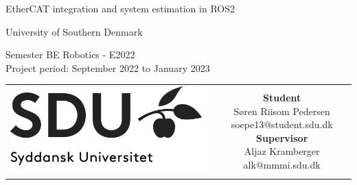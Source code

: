 \begin{titlepage}
	\begin{center}
		
		\null\vspace{2cm}
		
		{\huge
			EtherCAT integration and system estimation in ROS2
		}
	
		\vspace{1cm}
		
		{\Large
			University of Southern Denmark
		}
		
		\vspace{1cm}
		
		{\small
			 Semester BE Robotics - E2022\\
			Project period: September  2022 to January  2023
		}
	
		\vfill
		
		\begin{tabular}{cc}
			\parbox{0.25\textwidth}{
				\includegraphics[width=0.25 \textwidth]{../resources/sdu-logo.png}
			}
			&
			\parbox{0.55\textwidth}{
				{\small
					\textbf{Student} \\
					Søren Riisom Pedersen \hfill soepe13@student.sdu.dk \\
					\textbf{Supervisor} \\
					Aljaz Kramberger \hfill alk@mmmi.sdu.dk \\
				}
			}
		\end{tabular}
	
	\end{center}
\end{titlepage}
